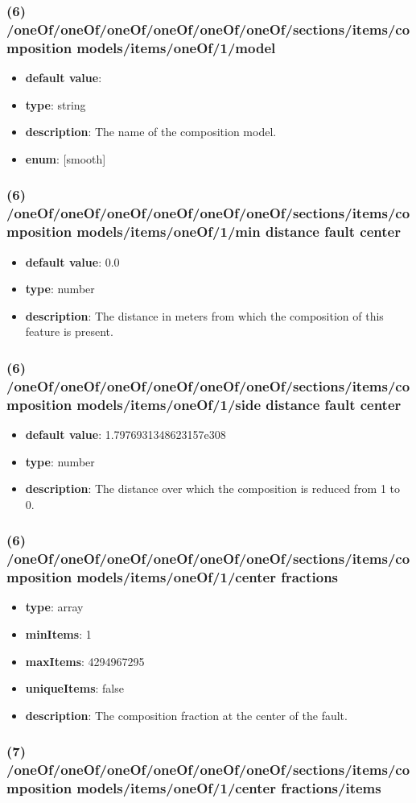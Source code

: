 \subsubsection{(6) /oneOf/oneOf/oneOf/oneOf/oneOf/oneOf/sections/items/composition models/items/oneOf/1/model}
\begin{itemize}[leftmargin=6em]\item {\bf default value}: 
\item {\bf type}: string
\item {\bf description}: The name of the composition model.
\item {\bf enum}: [smooth]\end{itemize}\subsubsection{(6) /oneOf/oneOf/oneOf/oneOf/oneOf/oneOf/sections/items/composition models/items/oneOf/1/min distance fault center}
\begin{itemize}[leftmargin=6em]\item {\bf default value}: 0.0
\item {\bf type}: number
\item {\bf description}: The distance in meters from which the composition of this feature is present.
\end{itemize}\subsubsection{(6) /oneOf/oneOf/oneOf/oneOf/oneOf/oneOf/sections/items/composition models/items/oneOf/1/side distance fault center}
\begin{itemize}[leftmargin=6em]\item {\bf default value}: 1.7976931348623157e308
\item {\bf type}: number
\item {\bf description}: The distance over which the composition is reduced from 1 to 0.
\end{itemize}\subsubsection{(6) /oneOf/oneOf/oneOf/oneOf/oneOf/oneOf/sections/items/composition models/items/oneOf/1/center fractions}
\begin{itemize}[leftmargin=6em]\item {\bf type}: array
\item {\bf minItems}: 1
\item {\bf maxItems}: 4294967295
\item {\bf uniqueItems}: false
\item {\bf description}: The composition fraction at the center of the fault.
\end{itemize}\subsubsection{(7) /oneOf/oneOf/oneOf/oneOf/oneOf/oneOf/sections/items/composition models/items/oneOf/1/center fractions/items}
